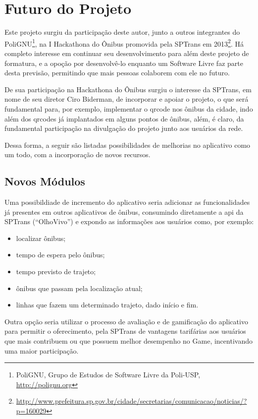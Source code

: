 \section{Futuro do Projeto}\label{sec:futuro}
Este projeto surgiu da participação deste autor, junto a outros integrantes do PoliGNU\footnote{PoliGNU, Grupo de Estudos de Software Livre da Poli-USP, \url{http://polignu.org}}, na I Hackathona do Ônibus promovida pela SPTrans em 2013\footnote{\url{http://www.prefeitura.sp.gov.br/cidade/secretarias/comunicacao/noticias/?p=160029}}. Há completo interesse em continuar seu desenvolvimento para além deste projeto de formatura, e a opoção por desenvolvê-lo enquanto um Software Livre faz parte desta previsão, permitindo que mais pessoas colaborem com ele no futuro.

De sua participação na Hackathona do Ônibus surgiu o interesse da SPTrans, em nome de seu diretor Ciro Biderman, de incorporar e apoiar o projeto, o que será fundamental para, por exemplo, implementar o \gls{qrcode} nos ônibus da cidade, indo além dos \gls{qrcode}s já implantados em alguns pontos de ônibus, além, é claro, da fundamental participação na divulgação do projeto junto aos usuários da rede.

Dessa forma, a seguir são listadas possibilidades de melhorias no aplicativo como um todo, com a incorporação de novos recursos.
\subsection{Novos Módulos}\label{subsec:futuro-novos-mod}
Uma possibildiade de incremento do aplicativo seria adicionar as funcionalidades já presentes em outros aplicativos de ônibus, consumindo diretamente a \gls{api} da SPTrans (``OlhoVivo'') e expondo as informações aos usuários como, por exemplo:
\begin{itemize}
    \item localizar ônibus;
    \item tempo de espera pelo ônibus;
    \item tempo previsto de trajeto;
    \item ônibus que passam pela localização atual;
    \item linhas que fazem um determinado trajeto, dado início e fim.
\end{itemize}

Outra opção seria utilizar o processo de avaliação e de gamificação do aplicativo para permitir o oferecimento, pela SPTrans de vantagens tarifárias aos usuários que mais contribuem ou que possuem melhor desempenho no Game, incentivando uma maior participação.

